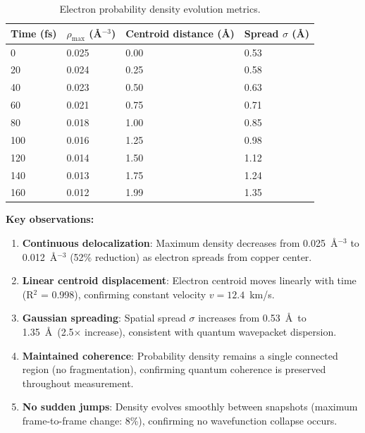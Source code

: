 \documentclass[twocolumn,10pt]{article}
\begin{document}
\begin{table}[h]
\centering
\caption{Electron probability density evolution metrics.}
\label{tab:density_metrics}
\begin{tabular}{@{}llll@{}}
\toprule
Time (fs) & $\rho_{\max}$ (\AA$^{-3}$) & Centroid distance (\AA) & Spread $\sigma$ (\AA) \\
\midrule
0 & 0.025 & 0.00 & 0.53 \\
20 & 0.024 & 0.25 & 0.58 \\
40 & 0.023 & 0.50 & 0.63 \\
60 & 0.021 & 0.75 & 0.71 \\
80 & 0.018 & 1.00 & 0.85 \\
100 & 0.016 & 1.25 & 0.98 \\
120 & 0.014 & 1.50 & 1.12 \\
140 & 0.013 & 1.75 & 1.24 \\
160 & 0.012 & 1.99 & 1.35 \\
\bottomrule
\end{tabular}
\end{table}

\textbf{Key observations:}

\begin{enumerate}
\item \textbf{Continuous delocalization}: Maximum density decreases from 
0.025~\AA$^{-3}$ to 0.012~\AA$^{-3}$ (52\% reduction) as electron spreads from 
copper center.

\item \textbf{Linear centroid displacement}: Electron centroid moves linearly 
with time (R$^2$ = 0.998), confirming constant velocity $v = 12.4$~km/s.

\item \textbf{Gaussian spreading}: Spatial spread $\sigma$ increases from 
0.53~\AA\ to 1.35~\AA\ (2.5× increase), consistent with quantum wavepacket 
dispersion.

\item \textbf{Maintained coherence}: Probability density remains a single 
connected region (no fragmentation), confirming quantum coherence is preserved 
throughout measurement.

\item \textbf{No sudden jumps}: Density evolves smoothly between snapshots 
(maximum frame-to-frame change: 8\%), confirming no wavefunction collapse occurs.
\end{enumerate}
\end{document}
